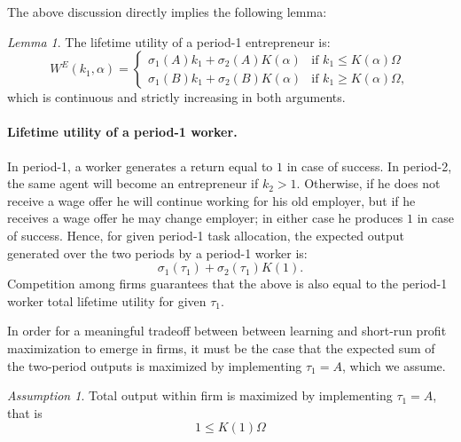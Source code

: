 \documentclass[12pt,american]{paper}
\theoremstyle{remark}
\newtheorem{ass}{Assumption}
\newtheorem{lemma}{Lemma}
\begin{document}
The above discussion directly implies the following lemma:
\begin{lemma}
The lifetime utility of a period-1 entrepreneur is:
\begin{equation}\label{eq: value entrepreneur}
W^E(k_1,\alpha)=\begin{cases}
\sigma_1(A) k_1+  \sigma_2(A)  K(\alpha)&\mbox{if } k_1\leq K(\alpha) \Omega \\
\sigma_1(B) k_1+  \sigma_2(B)  K(\alpha) &\mbox{if } k_1 \geq K(\alpha) \Omega, 
\end{cases}
\end{equation}
which is continuous and strictly increasing in both arguments.
\end{lemma}









\paragraph{Lifetime utility of a period-1 worker.}
In period-1, a worker generates a return equal to $1$ in case of success. In period-2, the same agent will become an entrepreneur if $k_2>1$. Otherwise, if he does not receive a wage offer he will continue working for his old employer, but if he receives a wage offer he may change employer; in either case he produces $1$ in case of success. Hence, for given period-1 task allocation, the expected output generated over the two periods by a period-1 worker is:
\[
\sigma_1(\tau_1)+\sigma_2(\tau_1) K(1).
\]
Competition among firms guarantees that the above is also equal to the period-1 worker total lifetime utility for given $\tau_1$. 

In order for a meaningful tradeoff between  between learning and short-run profit maximization to emerge in firms, it must be the case that the expected sum of the two-period outputs is maximized by implementing $\tau_1=A$, which we assume. 
%
\begin{ass}\label{ass: necessary for learning}
Total output within firm is maximized by implementing $\tau_1=A$, that is
\begin{equation}
1 \leq  K(1) \Omega
\end{equation}
\end{ass}
\end{document}
